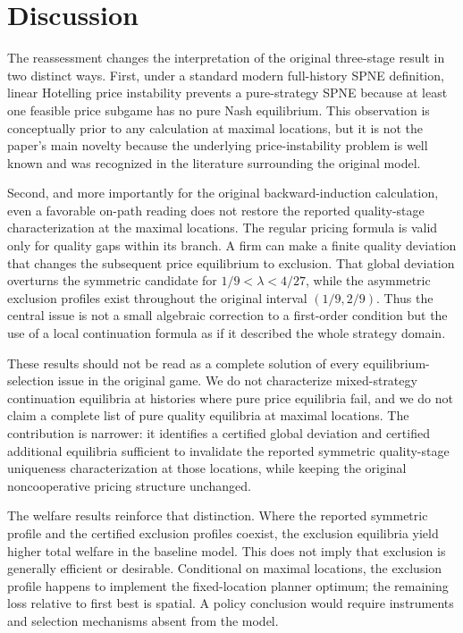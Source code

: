 \section{Discussion}\label{sec:discussion}

The reassessment changes the interpretation of the original three-stage result in two distinct ways. First, under a standard modern full-history SPNE definition, linear Hotelling price instability prevents a pure-strategy SPNE because at least one feasible price subgame has no pure Nash equilibrium. This observation is conceptually prior to any calculation at maximal locations, but it is not the paper's main novelty because the underlying price-instability problem is well known and was recognized in the literature surrounding the original model.

Second, and more importantly for the original backward-induction calculation, even a favorable on-path reading does not restore the reported quality-stage characterization at the maximal locations. The regular pricing formula is valid only for quality gaps within its branch. A firm can make a finite quality deviation that changes the subsequent price equilibrium to exclusion. That global deviation overturns the symmetric candidate for $1/9<\lambda<4/27$, while the asymmetric exclusion profiles exist throughout the original interval $(1/9,2/9)$. Thus the central issue is not a small algebraic correction to a first-order condition but the use of a local continuation formula as if it described the whole strategy domain.

These results should not be read as a complete solution of every equilibrium-selection issue in the original game. We do not characterize mixed-strategy continuation equilibria at histories where pure price equilibria fail, and we do not claim a complete list of pure quality equilibria at maximal locations. The contribution is narrower: it identifies a certified global deviation and certified additional equilibria sufficient to invalidate the reported symmetric quality-stage uniqueness characterization at those locations, while keeping the original noncooperative pricing structure unchanged.

The welfare results reinforce that distinction. Where the reported symmetric profile and the certified exclusion profiles coexist, the exclusion equilibria yield higher total welfare in the baseline model. This does not imply that exclusion is generally efficient or desirable. Conditional on maximal locations, the exclusion profile happens to implement the fixed-location planner optimum; the remaining loss relative to first best is spatial. A policy conclusion would require instruments and selection mechanisms absent from the model.
